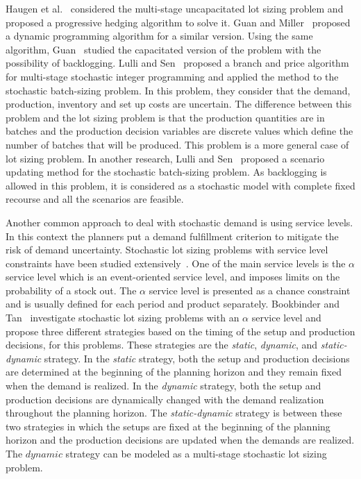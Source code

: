 \documentclass[10pt]{article}
\begin{document}
 Haugen et al.~\cite{haugen2001progressive} considered the multi-stage uncapacitated lot sizing problem and proposed a progressive hedging algorithm to solve it. Guan and Miller~\cite{guan2008polynomial} proposed a dynamic programming algorithm for a similar version. Using the same algorithm, Guan~\cite{guan2011stochastic} studied the capacitated version of the problem with the possibility of backlogging. Lulli and Sen~\cite{lulli2004branch} proposed a branch and price algorithm for multi-stage stochastic integer programming and applied the method to the stochastic batch-sizing problem. In this problem, they consider that the demand, production, inventory and set up costs are uncertain. The difference between this problem and the lot sizing problem is that the production quantities are in batches and the production decision variables are discrete values which define the number of batches that will be produced. This problem is a more general case of lot sizing problem. In another research, Lulli and Sen~\cite{lulli2004branch}  proposed a scenario updating method for the stochastic batch-sizing problem. As backlogging is allowed in this problem, it is considered as a stochastic model with complete fixed recourse and all the scenarios are feasible.  

Another common approach to deal with stochastic demand is using service levels. In this context the planners put  a demand fulfillment criterion to mitigate the risk of demand uncertainty. Stochastic lot sizing problems with service level constraints have been studied extensively~\cite{tempelmeier2007stochastic}. One of the main service levels is the $\alpha$ service level which is an event-oriented service level, and imposes limits on the probability of a stock out. The $\alpha$ service level is presented as a chance constraint and is usually defined for each period and product separately. Bookbinder and Tan~\cite{bookbinder1988strategies} investigate stochastic lot sizing problems with an $\alpha$ service level and propose three different strategies based on the timing of the setup and production decisions, for this problems. These strategies are the \textit{static}, \textit{dynamic}, and \textit{static-dynamic} strategy. In the \textit{static} strategy, both the setup and production decisions are determined at the beginning of the planning horizon and they remain fixed when the demand is realized. In the \textit{dynamic} strategy, both the setup and production decisions are dynamically changed with the demand realization throughout the planning horizon. The \textit{static-dynamic} strategy is between these two strategies in which the setups are fixed at the beginning of the planning horizon and the production decisions are updated when the demands are realized. The $dynamic$ strategy can be modeled as a multi-stage stochastic lot sizing problem.  
\end{document}
